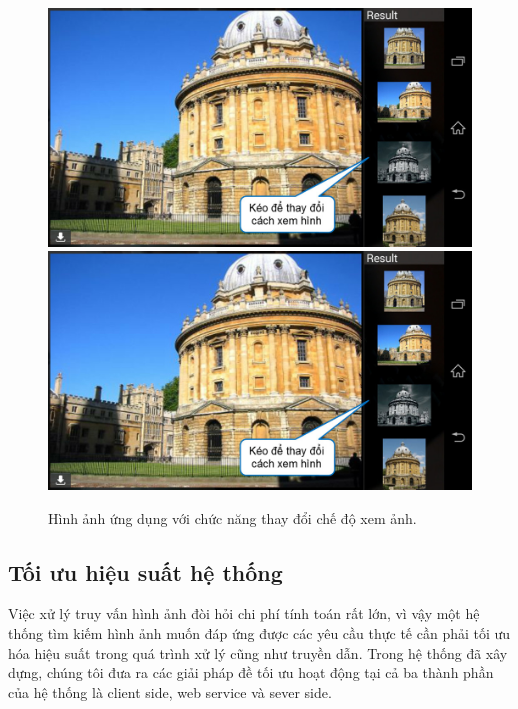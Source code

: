 {\begin{figure}[!htbp]
  \begin{center}
    \leavevmode
    \ifpdf
      \includegraphics[scale=0.17]{interface_6}
    \else
      \includegraphics[scale=0.17]{interface_6}
    \fi
    \caption[Ứng dụng cho phép người dùng thay đổi chế độ xem hình ảnh truy vấn bằng cách kéo khung kết quả để thu nhỏ, phóng to hình ảnh đang xem.]{Hình ảnh ứng dụng với chức năng thay đổi chế độ xem ảnh.}
    \label{FigChooseRegion}
  \end{center}
\end{figure}

\subsection{Tối ưu hiệu suất hệ thống}
Việc xử lý truy vấn hình ảnh đòi hỏi chi phí tính toán rất lớn, vì vậy một hệ thống tìm kiếm hình ảnh muốn đáp ứng được các yêu cầu thực tế cần phải tối ưu hóa hiệu suất trong quá trình xử lý cũng như truyền dẫn. Trong hệ thống đã xây dựng, chúng tôi đưa ra các giải pháp đề tối ưu hoạt động tại cả ba thành phần của hệ thống là client side, web service và sever side.

}
